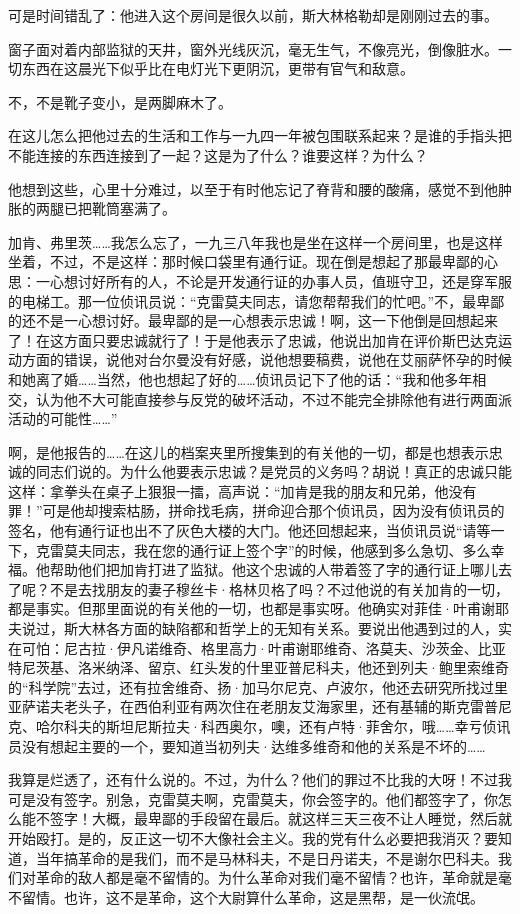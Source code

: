 可是时间错乱了：他进入这个房间是很久以前，斯大林格勒却是刚刚过去的事。

窗子面对着内部监狱的天井，窗外光线灰沉，毫无生气，不像亮光，倒像脏水。一切东西在这晨光下似乎比在电灯光下更阴沉，更带有官气和敌意。

不，不是靴子变小，是两脚麻木了。

在这儿怎么把他过去的生活和工作与一九四一年被包围联系起来？是谁的手指头把不能连接的东西连接到了一起？这是为了什么？谁要这样？为什么？

他想到这些，心里十分难过，以至于有时他忘记了脊背和腰的酸痛，感觉不到他肿胀的两腿已把靴筒塞满了。

加肯、弗里茨……我怎么忘了，一九三八年我也是坐在这样一个房间里，也是这样坐着，不过，不是这样：那时候口袋里有通行证。现在倒是想起了那最卑鄙的心思：一心想讨好所有的人，不论是开发通行证的办事人员，值班守卫，还是穿军服的电梯工。那一位侦讯员说：“克雷莫夫同志，请您帮帮我们的忙吧。”不，最卑鄙的还不是一心想讨好。最卑鄙的是一心想表示忠诚！啊，这一下他倒是回想起来了！在这方面只要忠诚就行了！于是他表示了忠诚，他说出加肯在评价斯巴达克运动方面的错误，说他对台尔曼没有好感，说他想要稿费，说他在艾丽萨怀孕的时候和她离了婚……当然，他也想起了好的……侦讯员记下了他的话：“我和他多年相交，认为他不大可能直接参与反党的破坏活动，不过不能完全排除他有进行两面派活动的可能性……”

啊，是他报告的……在这儿的档案夹里所搜集到的有关他的一切，都是也想表示忠诚的同志们说的。为什么他要表示忠诚？是党员的义务吗？胡说！真正的忠诚只能这样：拿拳头在桌子上狠狠一擂，高声说：“加肯是我的朋友和兄弟，他没有罪！”可是他却搜索枯肠，拼命找毛病，拼命迎合那个侦讯员，因为没有侦讯员的签名，他有通行证也出不了灰色大楼的大门。他还回想起来，当侦讯员说“请等一下，克雷莫夫同志，我在您的通行证上签个字”的时候，他感到多么急切、多么幸福。他帮助他们把加肯打进了监狱。他这个忠诚的人带着签了字的通行证上哪儿去了呢？不是去找朋友的妻子穆丝卡·格林贝格了吗？不过他说的有关加肯的一切，都是事实。但那里面说的有关他的一切，也都是事实呀。他确实对菲佳·叶甫谢耶夫说过，斯大林各方面的缺陷都和哲学上的无知有关系。要说出他遇到过的人，实在可怕：尼古拉·伊凡诺维奇、格里高力·叶甫谢耶维奇、洛莫夫、沙茨金、比亚特尼茨基、洛米纳泽、留京、红头发的什里亚普尼科夫，他还到列夫·鲍里索维奇的“科学院”去过，还有拉舍维奇、扬·加马尔尼克、卢波尔，他还去研究所找过里亚萨诺夫老头子，在西伯利亚有两次住在老朋友艾海家里，还有基辅的斯克雷普尼克、哈尔科夫的斯坦尼斯拉夫·科西奥尔，噢，还有卢特·菲舍尔，哦……幸亏侦讯员没有想起主要的一个，要知道当初列夫·达维多维奇和他的关系是不坏的……

我算是烂透了，还有什么说的。不过，为什么？他们的罪过不比我的大呀！不过我可是没有签字。别急，克雷莫夫啊，克雷莫夫，你会签字的。他们都签字了，你怎么能不签字！大概，最卑鄙的手段留在最后。就这样三天三夜不让人睡觉，然后就开始殴打。是的，反正这一切不大像社会主义。我的党有什么必要把我消灭？要知道，当年搞革命的是我们，而不是马林科夫，不是日丹诺夫，不是谢尔巴科夫。我们对革命的敌人都是毫不留情的。为什么革命对我们毫不留情？也许，革命就是毫不留情。也许，这不是革命，这个大尉算什么革命，这是黑帮，是一伙流氓。

